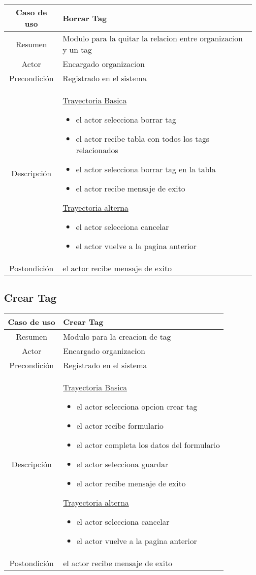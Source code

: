 \documentclass[letterpaper,openright,10pt,oneside]{report}
\begin{document}
\begin{tabular}{|c|p{110mm}|}
\hline
	Caso de uso & Borrar Tag\\
\hline
	Resumen & Modulo para la quitar la relacion entre organizacion y un tag\\
\hline
	Actor & Encargado organizacion\\
\hline
	Precondición & Registrado en el sistema\\
\hline
	Descripción & 
	\underline{Trayectoria Basica}
	\begin{itemize}
		\item el actor selecciona borrar tag
		\item el actor recibe tabla con todos los tags relacionados
		\item el actor selecciona borrar tag en la tabla
		\item el actor recibe mensaje de exito
	\end{itemize}
	\underline{Trayectoria alterna}
	\begin{itemize}
		\item el actor selecciona cancelar
		\item el actor vuelve a la pagina anterior
	\end{itemize}\\
\hline
	Postondición & el actor recibe mensaje de exito\\
\hline
\end{tabular}

\subsection{Crear Tag}

\begin{tabular}{|c|p{110mm}|}
\hline
	Caso de uso & Crear Tag\\
\hline
	Resumen & Modulo para la creacion de tag\\
\hline
	Actor & Encargado organizacion\\
\hline
	Precondición & Registrado en el sistema\\
\hline
	Descripción & 
	\underline{Trayectoria Basica}
	\begin{itemize}
		\item el actor selecciona opcion crear tag
		\item el actor recibe formulario
		\item el actor completa los datos del formulario
		\item el actor selecciona guardar
		\item el actor recibe mensaje de exito
	\end{itemize}
	\underline{Trayectoria alterna}
	\begin{itemize}
		\item el actor selecciona cancelar
		\item el actor vuelve a la pagina anterior
	\end{itemize}\\
\hline
	Postondición & el actor recibe mensaje de exito\\
\hline
\end{tabular}
\end{document}
